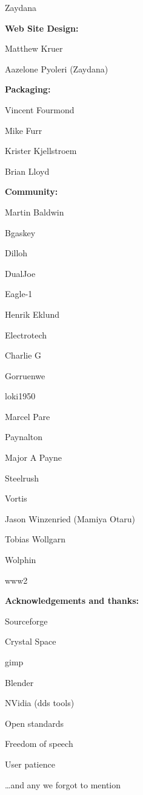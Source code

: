 \documentclass{article}
\begin{document}
Zaydana



\textbf{Web Site Design:}

Matthew Kruer

Aazelone Pyoleri (Zaydana)



\textbf{Packaging:}

Vincent Fourmond

Mike Furr

Krister Kjellstroem

Brian Lloyd



\textbf{Community:}

Martin Baldwin

Bgaskey

Dilloh

DualJoe

Eagle-1

Henrik Eklund

Electrotech

Charlie G

Gorruenwe

loki1950

Marcel Pare

Paynalton

Major A Payne

Steelrush

Vortis

Jason Winzenried (Mamiya Otaru)

Tobias Wollgarn

Wolphin

www2









\textbf{Acknowledgements and thanks:}

Sourceforge

Crystal Space

gimp

Blender

NVidia (dds tools)

Open standards

Freedom of speech

User patience

\dots  and any we forgot to mention
\end{document}
